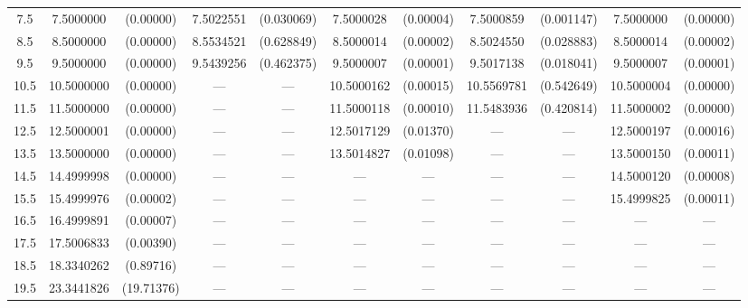 \documentclass[a4paper,14pt]{extarticle}
\begin{document}
\begin{landscape}
\begin{table}[H]
\begin{tabular}{|c*{5}{|cc}|}
      7.5                 &  7.5000000 &  (0.00000) &  7.5022551 & (0.030069) &  7.5000028 & (0.00004) &  7.5000859 & (0.001147) &  7.5000000 & (0.00000)  \\
      8.5                 &  8.5000000 &  (0.00000) &  8.5534521 & (0.628849) &  8.5000014 & (0.00002) &  8.5024550 & (0.028883) &  8.5000014 & (0.00002)  \\
      9.5                 &  9.5000000 &  (0.00000) &  9.5439256 & (0.462375) &  9.5000007 & (0.00001) &  9.5017138 & (0.018041) &  9.5000007 & (0.00001)  \\
     10.5                 & 10.5000000 &  (0.00000) &  ---       & ---        & 10.5000162 & (0.00015) & 10.5569781 & (0.542649) & 10.5000004 & (0.00000)  \\
     11.5                 & 11.5000000 &  (0.00000) &  ---       & ---        & 11.5000118 & (0.00010) & 11.5483936 & (0.420814) & 11.5000002 & (0.00000)  \\
     12.5                 & 12.5000001 &  (0.00000) &  ---       & ---        & 12.5017129 & (0.01370) & ---        & ---        & 12.5000197 & (0.00016)  \\
     13.5                 & 13.5000000 &  (0.00000) &  ---       & ---        & 13.5014827 & (0.01098) & ---        & ---        & 13.5000150 & (0.00011)  \\
     14.5                 & 14.4999998 &  (0.00000) &  ---       & ---        & ---        & ---       & ---        & ---        & 14.5000120 & (0.00008)  \\ 
     15.5                 & 15.4999976 &  (0.00002) &  ---       & ---        & ---        & ---       & ---        & ---        & 15.4999825 & (0.00011)  \\
     16.5                 & 16.4999891 &  (0.00007) &  ---       & ---        & ---        & ---       & ---        & ---        & ---        & ---        \\
     17.5                 & 17.5006833 &  (0.00390) &  ---       & ---        & ---        & ---       & ---        & ---        & ---        & ---        \\
     18.5                 & 18.3340262 &  (0.89716) &  ---       & ---        & ---        & ---       & ---        & ---        & ---        & ---        \\
     19.5                 & 23.3441826 & (19.71376) &  ---       & ---        & ---        & ---       & ---        & ---        & ---        & ---        \\
\hline
\end{tabular}
\end{table} 



\end{landscape}
\end{document}
